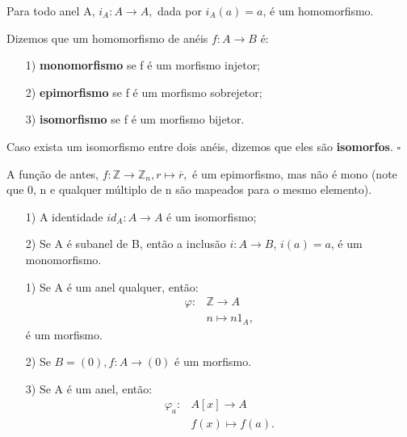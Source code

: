 \documentclass[algebraII_notes.tex]{subfiles}
\begin{document}
\begin{example}
	Para todo anel A, \(i_{A}:A\rightarrow A,\) dada por \(i_{A}(a) = a\), é um homomorfismo.
\end{example}
\begin{def*}
	Dizemos que um homomorfismo de anéis \(f:A\rightarrow B\) é:
	\begin{itemize}
		\item[1)] \textbf{monomorfismo} se f é um morfismo injetor;
		\item[2)] \textbf{epimorfismo} se f é um morfismo sobrejetor;
		\item[3)] \textbf{isomorfismo} se f é um morfismo bijetor.
	\end{itemize}
	Caso exista um isomorfismo entre dois anéis, dizemos que eles são \textbf{isomorfos}. \(\square\)
\end{def*}
\begin{example}
	A função de antes, \(f:\mathbb{Z}\rightarrow \mathbb{Z}_{n}, r \mapsto \overline{r},\) é um epimorfismo, mas não é mono (note que 0, n e qualquer múltiplo de n
	são mapeados para o mesmo elemento).
\end{example}
\begin{prop*}[Exercício]
	\begin{itemize}
		\item[1)] A identidade \(id_{A}:A\rightarrow A\) é um isomorfismo;
		\item[2)] Se A é subanel de B, então a inclusão \(i:A\rightarrow B\), \(i(a) = a\), é
		      um monomorfismo.
	\end{itemize}
\end{prop*}
\begin{example}[Exercício]
	\begin{itemize}
		\item[1)] Se A é um anel qualquer, então:
		      \begin{align*}
			      \varphi: & \mathbb{Z}\rightarrow A \\
			               & n\mapsto n1_{A},
		      \end{align*}
		      é um morfismo.
		\item[2)] Se \(B=(0), f:A\rightarrow (0)\) é um morfismo.
		\item[3)] Se A é um anel, então:
		      \begin{align*}
			      \varphi_{a}: & A[x]\rightarrow A \\
			                   & f(x)\mapsto f(a).
		      \end{align*}
	\end{itemize}
\end{example}
\end{document}
